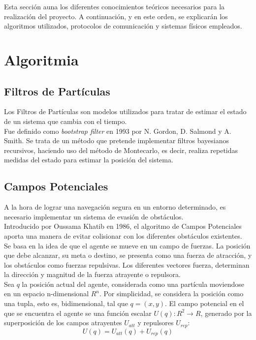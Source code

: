 

Esta sección auna los diferentes conocimientos teóricos necesarios para la realización del proyecto. A continuación, y en este orden, se explicarán los algoritmos utilizados, protocolos de comunicación y sistemas físicos empleados.

\section{Algoritmia}


\subsection{Filtros de Partículas}

Los Filtros de Partículas son modelos utilizados para tratar de estimar el estado de un sistema que cambia con el tiempo. 
\\Fue definido como \textit{bootstrap filter} en 1993 por N. Gordon, D. Salmond y A. Smith.  Se trata de un método que pretende implementar filtros bayesianos recursivos, haciendo uso del método de Montecarlo, es decir, realiza repetidas medidas del estado para estimar la posición del sistema.
\\ 

\subsection{Campos Potenciales}
\label{subsec:PF}
\setcounter{equation}{0}
A la hora de lograr una navegación segura en un entorno determinado, es necesario implementar un sistema de evasión de obstáculos. 
\\Introducido por Oussama Khatib en 1986, el algoritmo de Campos Potenciales aporta una manera de evitar colisionar con los diferentes obstáculos existentes.\\ Se basa en la idea de que el agente se mueve en un campo de fuerzas. La posición que debe alcanzar, su meta o destino, se presenta como una fuerza de atracción, y los obstáculos como fuerzas repulsivas. 
Los diferentes vectores fuerza, determinan la dirección y magnitud de la fuerza atrayente o repulsora.\\Sea $q$ la posición actual del agente, considerada como una partícula moviendose en un espacio n-dimensional $R^n$. Por simplicidad, se considera la posición como una tupla, esto es, bidimensional, tal que $q = (x,y)$. El campo potencial en el que se encuentra el agente se una función escalar $ U(q):R^2\rightarrow R $, generado por la superposición de los campos atrayentes $U_{att}$ y repulsores $U_{rep}$:
\begin{equation}
U(q) = U_{att}(q) + U_{rep}(q)
\label{equation:Uq}
\end{equation}

